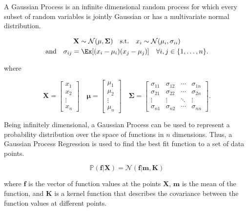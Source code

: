 \documentclass[\econtexRoot/SequentialEGM]{subfiles}
\begin{document}
A Gaussian Process is an infinite dimensional random process for which every subset of random variables is jointly Gaussian or has a multivariate normal distribution.

\begin{equation}
  \begin{gathered}
    \mathbf{X} \sim \mathcal{N}(\mathbf{\mu}, \mathbf{\Sigma}) \quad \text{s.t.} \quad x_i \sim \mathcal{N}(\mu_i, \sigma_{ii}) \\
    \text{and} \quad  \sigma_{ij} = \Ex[(x_i - \mu_i)(x_j - \mu_j)] \quad \forall i,j \in \{1, \ldots, n\}.
  \end{gathered}
\end{equation}


where

\begin{equation}
  \mathbf{X} = \begin{bmatrix}
    x_1    \\
    x_2    \\
    \vdots \\
    x_n
  \end{bmatrix}
  \quad
  \mathbf{\mu} = \begin{bmatrix}
    \mu_1  \\
    \mu_2  \\
    \vdots \\
    \mu_n
  \end{bmatrix}
  \quad
  \mathbf{\Sigma} = \begin{bmatrix}
    \sigma_{11} & \sigma_{12} & \cdots & \sigma_{1n} \\
    \sigma_{21} & \sigma_{22} & \cdots & \sigma_{2n} \\
    \vdots      & \vdots      & \ddots & \vdots      \\
    \sigma_{n1} & \sigma_{n2} & \cdots & \sigma_{nn}
  \end{bmatrix}.
\end{equation}

Being infinitely dimensional, a Gaussian Process can be used to represent a probability distribution over the space of functions in $n$ dimensions. Thus, a Gaussian Process Regression is used to find the best fit function to a set of data points.

\begin{equation}
  \mathbb{P}(\mathbf{f} | \mathbf{X}) = \mathcal{N}(\mathbf{f} | \mathbf{m}, \mathbf{K})
\end{equation}

where $\mathbf{f}$ is the vector of function values at the points $\mathbf{X}$, $\mathbf{m}$ is the mean of the function, and $\mathbf{K}$ is a kernel function that describes the covariance between the function values at different points.
\end{document}
